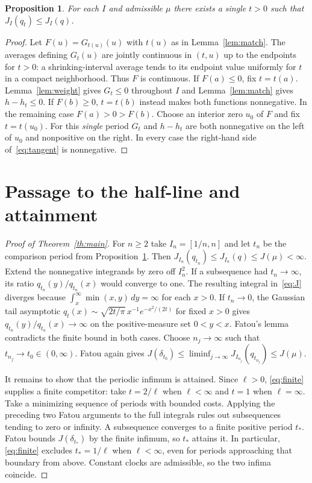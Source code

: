 \documentclass[11pt]{article}
\newtheorem{proposition}[theorem]{Proposition}
\begin{document}
\begin{proposition}\label{prop:compact}
For each $I$ and admissible $\mu$ there exists a single $t>0$ such that
$J_I(q_t)\le J_I(q)$.
\end{proposition}
\begin{proof}
Let $F(u)=G_{t(u)}(u)$ with $t(u)$ as in Lemma~\ref{lem:match}. The
averages defining $G_t(u)$ are jointly continuous in $(t,u)$ up to the
endpoints for $t>0$: a shrinking-interval average tends to its endpoint
value uniformly for $t$ in a compact neighborhood. Thus $F$ is continuous.
If $F(a)\le0$, fix $t=t(a)$. Lemma~\ref{lem:weight} gives $G_t\le0$
throughout $I$ and Lemma~\ref{lem:match} gives $h-h_t\le0$. If $F(b)\ge0$,
$t=t(b)$ instead makes both functions nonnegative. In the remaining case
$F(a)>0>F(b)$. Choose an interior zero $u_0$ of $F$ and fix $t=t(u_0)$.
For this \emph{single} period $G_t$ and $h-h_t$ are both nonnegative on
the left of $u_0$ and nonpositive on the right. In every case the
right-hand side of~\eqref{eq:tangent} is nonnegative.
\end{proof}

\section{Passage to the half-line and attainment}
\begin{proof}[Proof of Theorem~\ref{th:main}]
For $n\ge2$ take $I_n=[1/n,n]$ and let $t_n$ be the comparison period
from Proposition~\ref{prop:compact}. Then
$J_{I_n}(q_{t_n})\le J_{I_n}(q)\le J(\mu)<\infty$.
Extend the nonnegative integrands by zero off $I_n^2$.
If a subsequence had $t_n\to\infty$, its ratio $q_{t_n}(y)/q_{t_n}(x)$
would converge to one. The resulting integral in~\eqref{eq:J} diverges
because $\int_x^\infty \min(x,y)\,dy=\infty$ for each $x>0$.
If $t_n\to0$, the Gaussian tail asymptotic
$q_t(x)\sim\sqrt{2t/\pi}\,x^{-1}e^{-x^2/(2t)}$ for fixed $x>0$
gives $q_{t_n}(y)/q_{t_n}(x)\to\infty$ on the positive-measure set $0<y<x$.
Fatou's lemma contradicts the finite bound in both cases.
Choose $n_j\to\infty$ such that $t_{n_j}\to t_0\in(0,\infty)$. Fatou again
gives $J(\delta_{t_0})\le\liminf_{j\to\infty} J_{I_{n_j}}(q_{t_{n_j}})\le J(\mu)$.

It remains to show that the periodic infimum is attained.
Since $\ell>0$, \eqref{eq:finite} supplies a finite competitor: take
$t=2/\ell$ when $\ell<\infty$ and $t=1$ when $\ell=\infty$.
Take a minimizing sequence of periods with bounded costs.
Applying the preceding two Fatou arguments to the full integrals rules
out subsequences tending to zero or infinity. A subsequence converges to
a finite positive period $t_*$. Fatou bounds $J(\delta_{t_*})$ by the
finite infimum, so $t_*$ attains it. In particular, \eqref{eq:finite}
excludes $t_*=1/\ell$ when $\ell<\infty$, even for periods approaching
that boundary from above. Constant clocks are admissible, so the two
infima coincide.
\end{proof}
\end{document}
